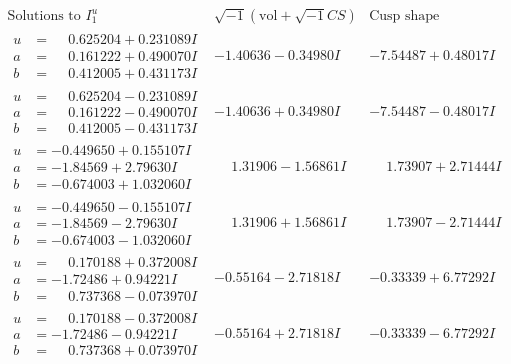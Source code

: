 \documentclass[1p]{elsarticle_modified}
\theoremstyle{definition}
\newcommand{\I}{\sqrt{-1}}
\begin{document}
$$\begin{array}{c|c|c}  
\text{Solutions to }I^u_{1}& \I (\text{vol} + \sqrt{-1}CS) & \text{Cusp shape}\\
 \hline 
\begin{aligned}
u &= \phantom{-}0.625204 + 0.231089 I \\
a &= \phantom{-}0.161222 + 0.490070 I \\
b &= \phantom{-}0.412005 + 0.431173 I\end{aligned}
 & -1.40636 - 0.34980 I & -7.54487 + 0.48017 I \\ \hline\begin{aligned}
u &= \phantom{-}0.625204 - 0.231089 I \\
a &= \phantom{-}0.161222 - 0.490070 I \\
b &= \phantom{-}0.412005 - 0.431173 I\end{aligned}
 & -1.40636 + 0.34980 I & -7.54487 - 0.48017 I \\ \hline\begin{aligned}
u &= -0.449650 + 0.155107 I \\
a &= -1.84569 + 2.79630 I \\
b &= -0.674003 + 1.032060 I\end{aligned}
 & \phantom{-}1.31906 - 1.56861 I & \phantom{-}1.73907 + 2.71444 I \\ \hline\begin{aligned}
u &= -0.449650 - 0.155107 I \\
a &= -1.84569 - 2.79630 I \\
b &= -0.674003 - 1.032060 I\end{aligned}
 & \phantom{-}1.31906 + 1.56861 I & \phantom{-}1.73907 - 2.71444 I \\ \hline\begin{aligned}
u &= \phantom{-}0.170188 + 0.372008 I \\
a &= -1.72486 + 0.94221 I \\
b &= \phantom{-}0.737368 - 0.073970 I\end{aligned}
 & -0.55164 - 2.71818 I & -0.33339 + 6.77292 I \\ \hline\begin{aligned}
u &= \phantom{-}0.170188 - 0.372008 I \\
a &= -1.72486 - 0.94221 I \\
b &= \phantom{-}0.737368 + 0.073970 I\end{aligned}
 & -0.55164 + 2.71818 I & -0.33339 - 6.77292 I \\ \hline\begin{aligned}

\end{aligned}
\end{array}$$
\end{document}

